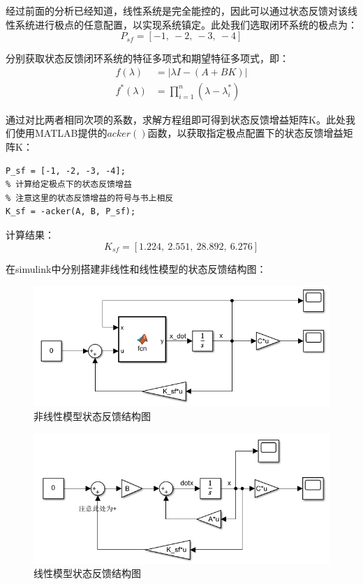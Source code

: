 \documentclass[UTF8]{article}
\begin{document}
经过前面的分析已经知道，线性系统是完全能控的，因此可以通过状态反馈对该线性系统进行极点的任意配置，以实现系统镇定。此处我们选取闭环系统的极点为：
\begin{equation*}
	P_{sf} = [-1,\ -2,\ -3,\ -4]
\end{equation*}

分别获取状态反馈闭环系统的特征多项式和期望特征多项式，即：
\begin{align*}
	f(\lambda) &= |\lambda I - (A + BK)| \\
	f^*(\lambda) &= \prod_{i=1}^n(\lambda - \lambda^*_i)
\end{align*}

通过对比两者相同次项的系数，求解方程组即可得到状态反馈增益矩阵K。此处我们使用MATLAB提供的$acker()$函数，以获取指定极点配置下的状态反馈增益矩阵K：
\begin{lstlisting}
P_sf = [-1, -2, -3, -4];
% 计算给定极点下的状态反馈增益
% 注意这里的状态反馈增益的符号与书上相反
K_sf = -acker(A, B, P_sf);
\end{lstlisting}
计算结果：
\begin{equation*}
	K_{sf} = [1.224,\ 2.551,\ 28.892,\ 6.276]
\end{equation*}

在simulink中分别搭建非线性和线性模型的状态反馈结构图：
\begin{figure}[H]
    \centering %
    \includegraphics[width=.6\textwidth]{figure/倒立摆-非线性模型-状态反馈.png} 
    \caption{非线性模型状态反馈结构图} %
\end{figure}
\begin{figure}[H]
    \centering %
    \includegraphics[width=.6\textwidth]{figure/倒立摆-线性模型-状态反馈.png} 
    \caption{线性模型状态反馈结构图} %
\end{figure}
\end{document}

